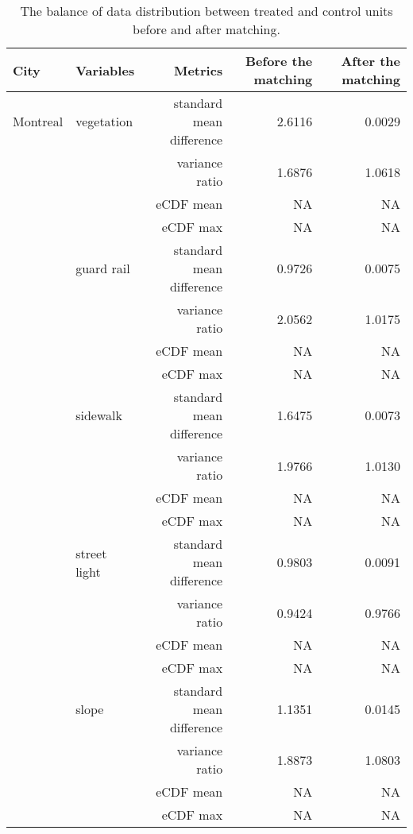 \begin{table}[!htp]\centering
\caption{The balance of data distribution between treated and control units before and after matching.}\label{result:tab:match_result}
\scriptsize
\begin{tabular}{llrrr}\toprule
City&Variables&Metrics&Before the matching &After the matching \\\midrule

Montreal & vegetation & standard mean difference & 2.6116 & \cellcolor{customgreen} 0.0029 \\
 &  & variance ratio & 1.6876 & \cellcolor{customgreen} 1.0618 \\
 &  & eCDF mean & NA &  NA \\
 &  & eCDF max & NA &  NA \\
 & guard rail & standard mean difference & 0.9726 & \cellcolor{customgreen} 0.0075 \\
 &  & variance ratio & 2.0562 & \cellcolor{customgreen} 1.0175 \\
 &  & eCDF mean & NA &  NA \\
 &  & eCDF max & NA &  NA \\
 & sidewalk & standard mean difference & 1.6475 & \cellcolor{customgreen} 0.0073 \\
 &  & variance ratio & 1.9766 & \cellcolor{customgreen} 1.0130 \\
 &  & eCDF mean & NA &  NA \\
 &  & eCDF max & NA &  NA \\
 & street light & standard mean difference & 0.9803 & \cellcolor{customgreen} 0.0091 \\
 &  & variance ratio & 0.9424 & \cellcolor{customgreen} 0.9766 \\
 &  & eCDF mean & NA &  NA \\
 &  & eCDF max & NA &  NA \\
 & slope & standard mean difference & 1.1351 & \cellcolor{customgreen} 0.0145 \\
 &  & variance ratio & 1.8873 & \cellcolor{customgreen} 1.0803 \\
 &  & eCDF mean & NA &  NA \\
 &  & eCDF max & NA &  NA \\
\bottomrule
\end{tabular}
\end{table}

